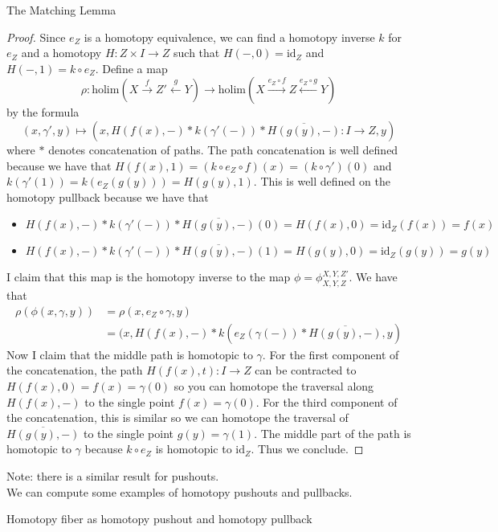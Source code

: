 \documentclass[a4paper]{article}
\begin{document}
\begin{thm}{The Matching Lemma}{}
\begin{proof}
Since $e_Z$ is a homotopy equivalence, we can find a homotopy inverse $k$ for $e_Z$ and a homotopy $H:Z\times I\to Z$ such that $H(-,0)=\text{id}_Z$ and $H(-,1)=k\circ e_Z$. Define a map $$\rho:\text{holim}(X\overset{f}{\rightarrow}Z'\overset{g}{\leftarrow}Y)\to\text{holim}(X\overset{e_Z\circ f}{\rightarrow}Z\overset{e_Z\circ g}{\leftarrow}Y)$$ by the formula $$(x,\gamma',y)\mapsto(x,H(f(x),-)\ast k(\gamma'(-))\ast\overline{H(g(y),-)}:I\to Z,y)$$ where $\ast$ denotes concatenation of paths. The path concatenation is well defined because we have that $H(f(x),1)=(k\circ e_Z\circ f)(x)=(k\circ\gamma')(0)$ and $k(\gamma'(1))=k(e_Z(g(y)))=H(g(y),1)$. This is well defined on the homotopy pullback because we have that 
\begin{itemize}
\item $H(f(x),-)\ast k(\gamma'(-))\ast\overline{H(g(y),-)}(0)=H(f(x),0)=\text{id}_Z(f(x))=f(x)$
\item $H(f(x),-)\ast k(\gamma'(-))\ast\overline{H(g(y),-)}(1)=H(g(y),0)=\text{id}_Z(g(y))=g(y)$
\end{itemize}
I claim that this map is the homotopy inverse to the map $\phi=\phi_{X,Y,Z}^{X,Y,Z'}$. We have that 
\begin{align*}
\rho(\phi(x,\gamma,y))&=\rho(x,e_Z\circ\gamma,y)\\
&=(x,H(f(x),-)\ast k(e_Z(\gamma(-))\ast\overline{H(g(y),-)},y)
\end{align*}
Now I claim that the middle path is homotopic to $\gamma$. For the first component of the concatenation, the path $H(f(x),t):I\to Z$ can be contracted to $H(f(x),0)=f(x)=\gamma(0)$ so you can homotope the traversal along $H(f(x),-)$ to the single point $f(x)=\gamma(0)$. For the third component of the concatenation, this is similar so we can homotope the traversal of $\overline{H(g(y),-)}$ to the single point $g(y)=\gamma(1)$. The middle part of the path is homotopic to $\gamma$ because $k\circ e_Z$ is homotopic to $\text{id}_Z$. Thus we conclude. 
\end{proof}
\end{thm}

Note: there is a similar result for pushouts. \\

We can compute some examples of homotopy pushouts and pullbacks. 

\begin{eg}{}{} Homotopy fiber as homotopy pushout and homotopy pullback
\end{eg}
\end{document}
